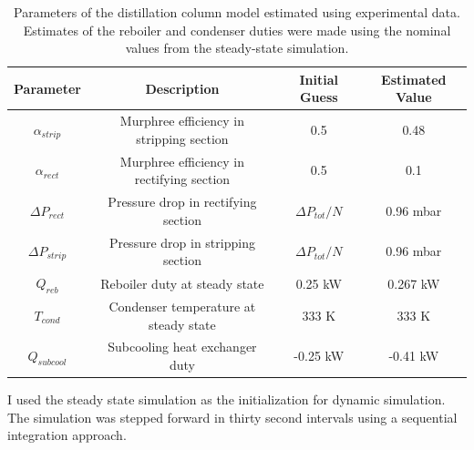 \begin{table}
    \centering
    \caption{Parameters of the distillation column model estimated using experimental data. Estimates of the reboiler and condenser duties were made using the nominal values from the steady-state simulation.}
    \begin{tabular}{cccc}
        \textbf{Parameter} & \textbf{Description} & \textbf{Initial Guess} & \textbf{Estimated Value}  \\
        \hline
         $\alpha_{strip}$ & Murphree efficiency in stripping section &  0.5 & 0.48 \\ 
         $\alpha_{rect}$ & Murphree efficiency in rectifying section & 0.5 & 0.1 \\
         $\Delta P_{rect}$ & Pressure drop in rectifying section &  $\Delta P_{tot}/N$ & 0.96 mbar \\ 
         $\Delta P_{strip}$ & Pressure drop in stripping section &  $\Delta P_{tot}/N$ & 0.96 mbar \\ 
         $ Q_{reb}$ & Reboiler duty at steady state &  0.25 kW  & 0.267 kW  \\
         $ T_{cond}$ & Condenser temperature at steady state &  333 K  & 333 K\\
         $ Q_{subcool}$ & Subcooling heat exchanger duty & -0.25  kW & -0.41 kW \\
         \hline
    \end{tabular}
    \label{tab:param_estimation}
\end{table}

I used the steady state simulation as the initialization for dynamic simulation. The simulation was stepped forward in thirty second intervals using a sequential integration approach. 




